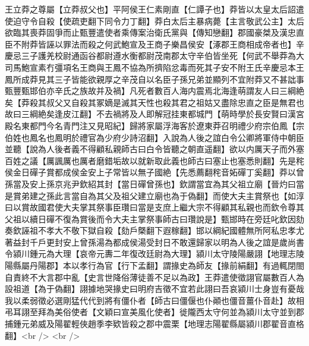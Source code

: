 王立莽之尊屬【立莽叔父也】平阿侯王仁素剛直【仁譚子也】莽皆以太皇太后詔遣使迫守令自殺【使疏吏翻下同令力丁翻】莽白太后主暴病薨【主言敬武公主】太后欲臨其喪莽固爭而止甄豐遣使者乘傳案治衛氏黨與【傳知戀翻】郡國豪桀及漢忠直臣不附莽皆誣以罪法而殺之何武鮑宣及王商子樂昌侯安【涿郡王商相成帝者也】辛慶忌三子護羌校尉通函谷都尉遵水衡都尉茂南郡太守辛伯皆坐死【何武不舉莽為大司馬鮑宣素冇彊項名王商與王鳳不協為所擠陷忿毒而死其子安不附王氏辛慶忌本王鳳所成莽見其三子皆能欲親厚之辛茂自以名臣子孫兄弟並顯列不宜附莽又不甚詘事甄豐甄邯伯亦辛氏之族故并及禍】凡死者數百人海内震焉北海逢萌謂友人曰三綱絶矣【莽殺其叔父又自殺其冢嫡是滅其天性也殺其君之祖姑又盡除忠直之臣是無君也故曰三綱絶矣逢皮江翻】不去禍將及人即解冠挂東都城門【萌時學於長安賢曰漢宮殿名東都門今名青門注又見昭紀】歸將家屬浮海客於遼東莽召明禮少府宗伯鳳【宗伯姓也鳳名也鳳明於禮官為少府少詩沼翻】入說為人後之誼白令公卿將軍侍中朝臣並聽【說為人後者義不得顧私親師古曰白令皆聽之朝直遥翻】欲以内厲天子而外塞百姓之議【厲諷厲也厲者磨錯垢故以就新取此義也師古曰塞止也塞悉則翻】先是秺侯金日磾子賞都成侯金安上子常皆以無子國絶【先悉薦翻秺音妬磾丁奚翻】莽以曾孫當及安上孫京兆尹欽紹其封【當日磾曾孫也】欽謂當宜為其父祖立廟【晉灼曰當是賞弟建之孫此言當自為其父及祖父建立廟也為于偽翻】而使大夫主賞祭也【如淳曰以賞故國君使大夫掌其祭事臣瓚曰當是支庶上繼大宗不得顧其私親也而欽令尊其父祖以續日磾不復為賞後而令大夫主掌祭事師古曰瓚說是】甄邯時在旁廷叱欽因劾奏欽誣祖不孝大不敬下獄自殺【劾戶槩翻下遐稼翻】邯以綱紀國體無所阿私忠孝尤著益封千戶更封安上曾孫湯為都成侯湯受封日不敢還歸家以明為人後之誼是歲尚書令潁川鍾元為大理【哀帝元夀二年復改廷尉為大理】潁川太守陵陽嚴詡【地理志陵陽縣屬丹陽郡】本以孝行為官【行下孟翻】謂掾史為師友【掾前絹翻】有過輒閉閤自責終不大言郡中亂【史言世降俗薄徒善不足以為政】王莽遣使徵詡官屬數百人為設祖道【為于偽翻】詡據地哭掾史曰明府吉徵不宜若此詡曰吾哀潁川士身豈有憂哉我以柔弱徵必選剛猛代代到將有僵仆者【師古曰僵偃也仆顚也僵音薑仆音赴】故相弔耳詡至拜為美俗使者【文穎曰宣美風化使者】徙隴西太守何並為潁川太守並到郡捕鍾元弟威及陽翟輕俠趙季李欵皆殺之郡中震栗【地理志陽翟縣屬潁川郡翟音直格翻】<br />
<br />
